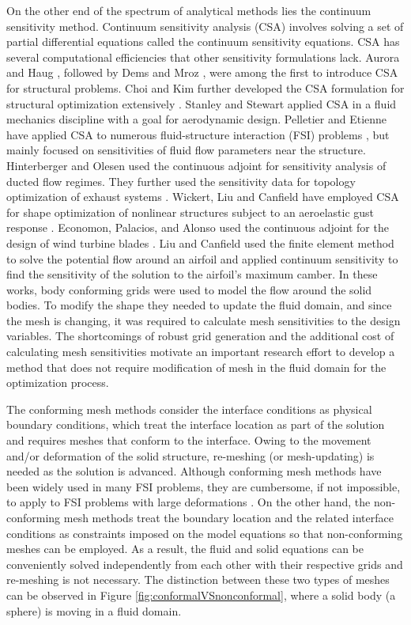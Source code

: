 \documentclass{aiaa-pretty}
\begin{document}
On the other end of the spectrum of analytical methods lies the continuum sensitivity method. Continuum sensitivity analysis (CSA) involves solving a set of partial differential equations called the continuum sensitivity equations. CSA has several computational efficiencies that other sensitivity formulations lack. Aurora and Haug \cite{Arora}, followed by Dems and Mroz \cite{Dems-Mroz}, were among the first to introduce CSA for structural problems. Choi and Kim further developed the CSA formulation for structural optimization extensively \cite{choi2005structural}. Stanley and Stewart \cite{stanley2002design} applied CSA in a fluid mechanics discipline with a goal for aerodynamic design. Pelletier and Etienne have applied CSA to numerous fluid-structure interaction (FSI) problems \cite{etienne2005general}, but mainly focused on sensitivities of fluid flow parameters near the structure. Hinterberger and Olesen used the continuous adjoint for sensitivity analysis of ducted flow regimes. They further used the sensitivity data for topology optimization of exhaust systems \cite{hinterberger2010automatic}. Wickert, Liu and Canfield have employed CSA for shape optimization of nonlinear structures subject to an aeroelastic gust response \cite{wickert2008least, liu2013equivalence}. Economon, Palacios, and Alonso used the continuous adjoint for the design of wind turbine blades \cite{economon2013viscous}.  Liu and Canfield \cite{liu2013boundary} used the finite element method to solve the potential flow around an airfoil and applied continuum sensitivity to find the sensitivity of the solution to the airfoil's maximum camber. In these works, body conforming grids were used to model the flow around the solid bodies.  To modify the shape they needed to update the fluid domain, and since the mesh is changing, it was required to calculate mesh sensitivities to the design variables. The shortcomings of robust grid generation and the additional cost of calculating mesh sensitivities motivate an important research effort to develop a method that does not require modification of mesh in the fluid domain for the optimization process.

The conforming mesh methods consider the interface conditions as physical boundary conditions, which treat the interface location as part of the solution and requires meshes that conform to the interface. Owing to the movement and/or deformation of the solid structure, re-meshing (or mesh-updating) is needed as the solution is advanced. Although conforming mesh methods have been widely used in many FSI problems, they are cumbersome, if not impossible, to apply to FSI problems with large deformations \cite{sahin2009arbitrary}. On the other hand, the non-conforming mesh methods treat the boundary location and the related interface conditions as constraints imposed on the model equations so that non-conforming meshes can be employed. As a result, the fluid and solid equations can be conveniently solved independently from each other with their respective grids and re-meshing is not necessary. The distinction between these two types of meshes can be observed in Figure \ref{fig:conformalVSnonconformal}, where a solid body (a sphere) is moving in a fluid domain.
\end{document}
